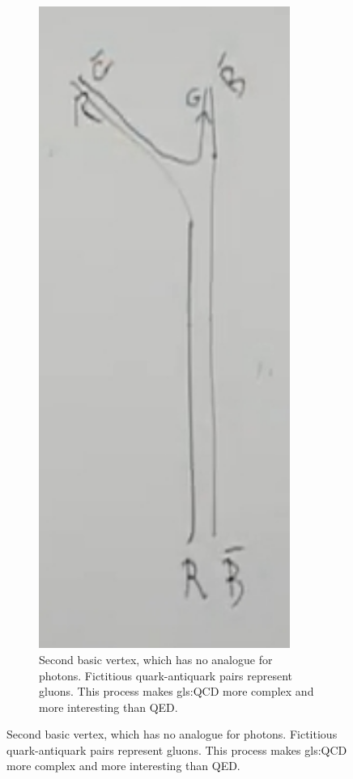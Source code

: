 \documentclass[]{article}
\begin{document}
\begin{figure}[H]
	\caption{Second basic vertex of \gls{gls:QCD}: gluons}
		\begin{subfigure}[t]{0.40\textwidth}
		\caption{Second basic vertex, which has no analogue for photons. Fictitious quark-antiquark pairs represent gluons. This process makes \gls{gls:QCD} more complex and more interesting than QED.}\label{fig:2-2-gluon5}
		\includegraphics[width=0.9\textwidth]{2-2-gluon5}

\end{subfigure}
\end{figure}
\end{document}
